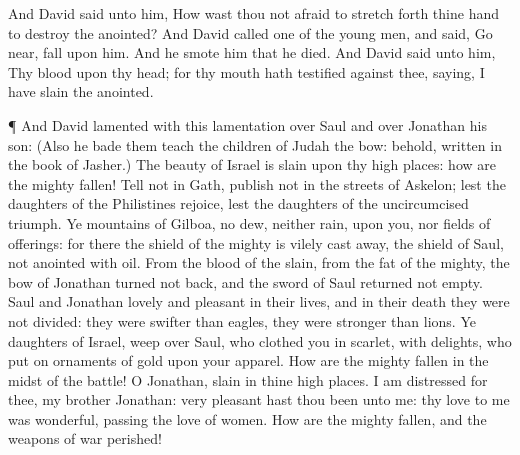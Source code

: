 {And
David
said unto him, How wast thou not
afraid to stretch
forth thine
hand to
destroy the
{}
anointed?
And
David
called
one of the young
men, and
said, Go
near,
{}
fall upon him. And he
smote him that he
died.
And
David
said unto him, Thy
blood
{} upon thy
head; for thy
mouth hath
testified against thee,
saying, I have
slain the
{}
anointed.
\par }{\PP {}¶ And
David
lamented with this
lamentation over
Saul and over
Jonathan his
son:
(Also he
bade them
teach the
children of
Judah
{} the
bow: behold,
{}
written in the
book of
Jasher.)
The
beauty of
Israel is
slain upon thy high
places: how are the
mighty
fallen!
Tell
{} not in
Gath,
publish
{} not in the
streets of
Askelon; lest the
daughters of the
Philistines
rejoice, lest the
daughters of the
uncircumcised
triumph.
Ye
mountains of
Gilboa,
{} no
dew, neither
{}
rain, upon you, nor
fields of
offerings: for there the
shield of the
mighty is vilely cast
away, the
shield of
Saul,
{} not
{}
anointed with
oil.
From the
blood of the
slain, from the
fat of the
mighty, the
bow of
Jonathan
turned not
back, and the
sword of
Saul
returned not
empty.
Saul and
Jonathan
{}
lovely and
pleasant in their
lives, and in their
death they were not
divided: they were
swifter than
eagles, they were
stronger than
lions.
Ye
daughters of
Israel, weep
over
Saul, who
clothed you in
scarlet, with
{}
delights, who
put on
ornaments of
gold upon your
apparel.
How are the
mighty
fallen in the
midst of the
battle! O
Jonathan,
{}
slain in thine high
places.
I am
distressed for thee, my
brother
Jonathan:
very
pleasant hast thou been unto me: thy
love to me was
wonderful, passing the
love of
women.
How are the
mighty
fallen, and the
weapons of
war
perished!

}
